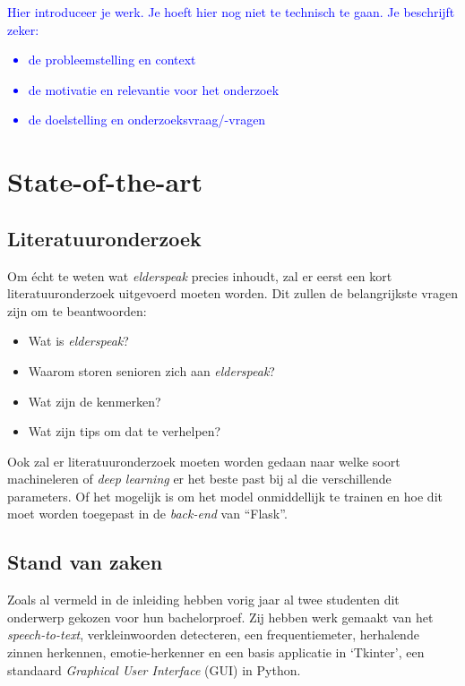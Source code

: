 \textcolor{blue}{Hier introduceer je werk. Je hoeft hier nog niet te technisch te gaan.
Je beschrijft zeker:
\begin{itemize}
  \item de probleemstelling en context
  \item de motivatie en relevantie voor het onderzoek
  \item de doelstelling en onderzoeksvraag/-vragen
\end{itemize}}



\section{State-of-the-art}
\label{sec:state-of-the-art}

\subsection{Literatuuronderzoek}\label{subsec:literatuuronderzoek}

Om écht te weten wat \textit{elderspeak} precies inhoudt, zal er eerst een kort literatuuronderzoek uitgevoerd moeten worden.
Dit zullen de belangrijkste vragen zijn om te beantwoorden:
\begin{itemize}
	\item Wat is \textit{elderspeak}?
	\item Waarom storen senioren zich aan \textit{elderspeak}?
	\item Wat zijn de kenmerken?
	\item Wat zijn tips om dat te verhelpen?
\end{itemize}

Ook zal er literatuuronderzoek moeten worden gedaan naar welke soort machineleren of \textit{deep learning} er het beste past bij al die verschillende parameters.
Of het mogelijk is om het model onmiddellijk te trainen en hoe dit moet worden toegepast in de \textit{back-end} van ``Flask''.

\subsection{Stand van zaken}\label{subsec:stand-van-zaken}

Zoals al vermeld in de inleiding hebben vorig jaar al twee studenten dit onderwerp gekozen voor hun bachelorproef.
Zij hebben werk gemaakt van het \textit{speech-to-text}, verkleinwoorden detecteren, een frequentiemeter, herhalende zinnen herkennen, emotie-herkenner en een basis applicatie in `Tkinter', een standaard \textit{Graphical User Interface} (GUI) in Python.

